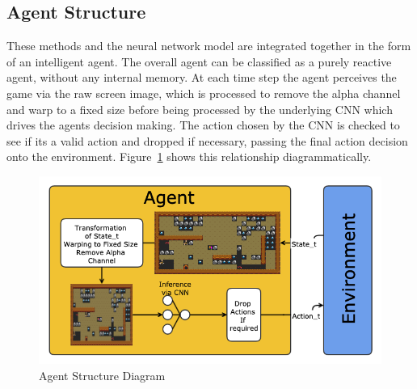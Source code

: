 \subsection{Agent Structure}
These methods and the neural network model are integrated together in the form of an intelligent agent.
The overall agent can be classified as a purely reactive agent, without any internal memory.
At each time step the agent perceives the game via the raw screen image, which is processed to remove the alpha channel and warp to a fixed size before being processed by the underlying CNN which drives the agents decision making.
The action chosen by the CNN is checked to see if its a valid action and dropped if necessary, passing the final action decision onto the environment.
Figure~\ref{fig:agentStructure} shows this relationship diagrammatically.
\begin{figure}[h]
  \centering
  \includegraphics[width=0.7\linewidth]{figures/agentStructure.png}
  \caption{Agent Structure Diagram}
  \label{fig:agentStructure}
\end{figure}